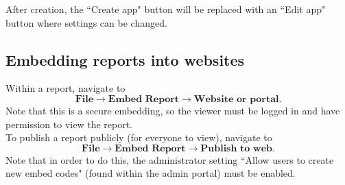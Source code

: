 \documentclass[10pt, openany, twocolumn]{book}
\begin{document}
After creation, the ``Create app" button will be replaced with an ``Edit app" button where settings can be changed.

\subsection*{Embedding reports into websites}

Within a report, navigate to 
$$\textbf{File} \rightarrow \textbf{Embed Report} \rightarrow \textbf{Website or portal}.$$
Note that this is a secure embedding, so the viewer must be logged in and have permission to view the report.\\

To publish a report publicly (for everyone to view), navigate to 
$$\textbf{File} \rightarrow \textbf{Embed Report} \rightarrow \textbf{Publish to web}.$$ 
Note that in order to do this, the administrator setting ``Allow users to create new embed codes" (found within the admin portal) must be enabled.
\end{document}
